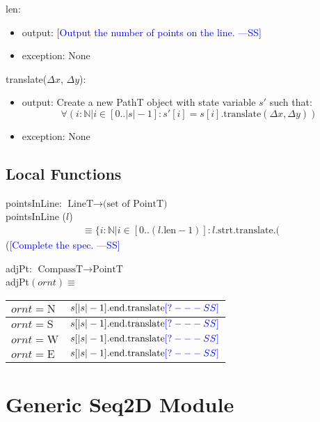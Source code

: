 \documentclass[12pt]{article}
\newcommand{\authornote}[3]{\textcolor{#1}{[#3 ---#2]}}
\newcommand{\authornote}[3]{}
\newcommand{\wss}[1]{\authornote{blue}{SS}{#1}}
\begin{document}
\noindent len:
\begin{itemize}
\item output: \wss{Output the number of points on the line.}
\item exception: None
\end{itemize}

\noindent translate($\Delta x$, $\Delta y$):
\begin{itemize}
\item output: Create a new PathT object with state variable $s'$ such that:
$$\forall(i: \mathbb{N} | i \in [0..|s|-1] : s'[i] = s[i].\mbox{translate}(\Delta x, \Delta y))$$
\item exception: None
\end{itemize}

\subsection*{Local Functions}

pointsInLine: $\mbox{LineT} \rightarrow \mbox{(set of PointT)}$\\

\noindent pointsInLine ($l$) 
\begin{multline*}
\equiv \{ i: \mathbb{N} | i \in [0
  .. (l.\mbox{len} - 1)] : l.\mbox{strt}.\mbox{translate}.(
\end{multline*} (\wss{Complete the spec.}

\noindent adjPt: $\mbox{CompassT} \rightarrow \mbox{PointT}$\\
adjPt$(ornt) \equiv$

\medskip

\begin{tabular}{|l|l|}
\hline
$ornt = \mbox{N}$ & $s[|s|-1].\mbox{end}.\mbox{translate}\wss{?}$\\
\hline
$ornt = \mbox{S}$ & $s[|s|-1].\mbox{end}.\mbox{translate}\wss{?}$\\
\hline
$ornt = \mbox{W}$ & $s[|s|-1].\mbox{end}.\mbox{translate}\wss{?}$\\
\hline
$ornt = \mbox{E}$ & $s[|s|-1].\mbox{end}.\mbox{translate}\wss{?}$\\
\hline
\end{tabular}

\newpage

\section* {Generic Seq2D Module}
\end{document}
